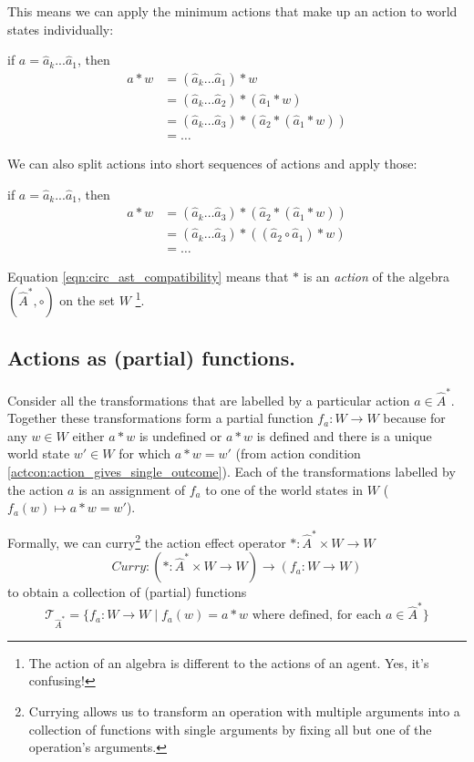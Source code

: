 This means we can apply the minimum actions that make up an action to world states individually:

if $a = \hat{a}_{k}...\hat{a}_{1}$, then
\begin{align}
	a \ast w & = (\hat{a}_{k} \dots \hat{a}_{1}) \ast w                                       \\
	         & = (\hat{a}_{k} \dots \hat{a}_{2}) \ast (\hat{a}_{1} \ast w)                    \\
	         & = (\hat{a}_{k} \dots \hat{a}_{3}) \ast (\hat{a}_{2} \ast (\hat{a}_{1} \ast w)) \\
	         & = \dots
\end{align}

We can also split actions into short sequences of actions and apply those:

if $a = \hat{a}_{k}...\hat{a}_{1}$, then
\begin{align}
	a \ast w & = (\hat{a}_{k} \dots \hat{a}_{3}) \ast (\hat{a}_{2} \ast (\hat{a}_{1} \ast w)) \\
	         & = (\hat{a}_{k} \dots \hat{a}_{3}) \ast ((\hat{a}_{2} \circ \hat{a}_{1}) \ast w)      \\
	         & = \dots
\end{align}

Equation \ref{eqn:circ_ast_compatibility} means that $\ast$ is an \emph{action} of the algebra $(\hat{A}^{\ast}, \circ)$ on the set $W$ \footnote{
The action of an algebra is different to the actions of an agent.
Yes, it's confusing!
}.


\subsection{Actions as (partial) functions.}

Consider all the transformations that are labelled by a particular action $a \in \hat{A}^{\ast}$.
Together these transformations form a partial function $f_{a}: W \to W$ because for any $w \in W$ either $a \ast w$ is undefined or $a \ast w$ is defined and there is a unique world state $w' \in W$ for which $a \ast w = w'$ (from action condition \ref{actcon:action_gives_single_outcome}).
Each of the transformations labelled by the action $a$ is an assignment of $f_{a}$ to one of the world states in $W$ ($f_{a}(w) \mapsto a \ast w = w'$).

Formally, we can curry\footnote{Currying allows us to transform an operation with multiple arguments into a collection of functions with single arguments by fixing all but one of the operation's arguments.} the action effect operator $\ast : \hat{A}^{\ast} \times W \to W$
\begin{equation}
	\textit{Curry}: (\ast: \hat{A}^{\ast} \times W \to W) \to (f_{a}: W \to W)
\end{equation}
to obtain a collection of (partial) functions
\begin{equation}
	\mathcal{T}_{\hat{A}^{\ast}} = \{f_{a}: W \to W \mid f_{a}(w) = a \ast w \text{ where defined, for each } a \in \hat{A}^{\ast} \}
\end{equation}

